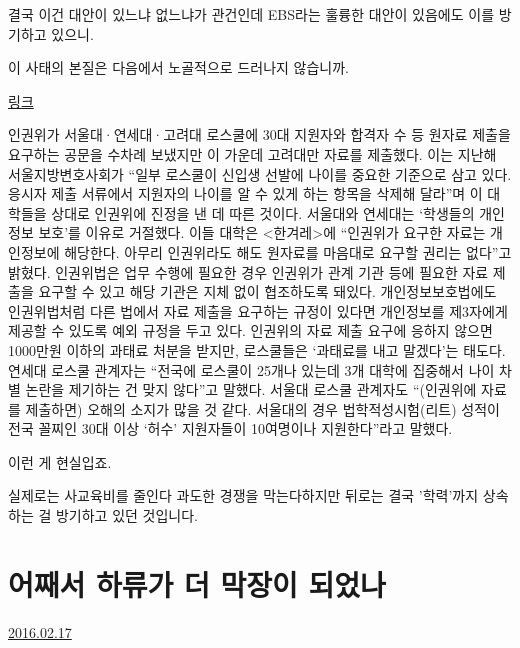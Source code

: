 결국 이건 대안이 있느냐 없느냐가 관건인데 EBS라는 훌륭한 대안이 있음에도 이를 방기하고 있으니.
\vspace{5mm}

이 사태의 본질은 다음에서 노골적으로 드러나지 않습니까.
\vspace{5mm}

\href{http://news.naver.com/main/read.nhn?mode=LSD&mid=sec&sid1=102&oid=028&aid=0002306493}{링크}
\vspace{5mm}

인권위가 서울대·연세대·고려대 로스쿨에 30대 지원자와 합격자 수 등 원자료 제출을 요구하는 공문을 수차례 보냈지만 이 가운데 고려대만 자료를 제출했다. 이는 지난해 서울지방변호사회가 “일부 로스쿨이 신입생 선발에 나이를 중요한 기준으로 삼고 있다. 응시자 제출 서류에서 지원자의 나이를 알 수 있게 하는 항목을 삭제해 달라”며 이 대학들을 상대로 인권위에 진정을 낸 데 따른 것이다.  서울대와 연세대는 ‘학생들의 개인정보 보호’를 이유로 거절했다. 이들 대학은 <한겨레>에 “인권위가 요구한 자료는 개인정보에 해당한다. 아무리 인권위라도 해도 원자료를 마음대로 요구할 권리는 없다”고 밝혔다.  인권위법은 업무 수행에 필요한 경우 인권위가 관계 기관 등에 필요한 자료 제출을 요구할 수 있고 해당 기관은 지체 없이 협조하도록 돼있다. 개인정보보호법에도 인권위법처럼 다른 법에서 자료 제출을 요구하는 규정이 있다면 개인정보를 제3자에게 제공할 수 있도록 예외 규정을 두고 있다. 인권위의 자료 제출 요구에 응하지 않으면 1000만원 이하의 과태료 처분을 받지만, 로스쿨들은 ‘과태료를 내고 말겠다’는 태도다. 연세대 로스쿨 관계자는 “전국에 로스쿨이 25개나 있는데 3개 대학에 집중해서 나이 차별 논란을 제기하는 건 맞지 않다”고 말했다. 서울대 로스쿨 관계자도 “(인권위에 자료를 제출하면) 오해의 소지가 많을 것 같다. 서울대의 경우 법학적성시험(리트) 성적이 전국 꼴찌인 30대 이상 ‘허수’ 지원자들이 10여명이나 지원한다”라고 말했다.
\vspace{5mm}

이런 게 현실입죠.
\vspace{5mm}

실제로는 사교육비를 줄인다 과도한 경쟁을 막는다하지만
뒤로는 결국 '학력'까지 상속하는 걸 방기하고 있던 것입니다.
\vspace{5mm}






\section{어째서 하류가 더 막장이 되었나}
\href{https://www.kockoc.com/Apoc/639454}{2016.02.17}

